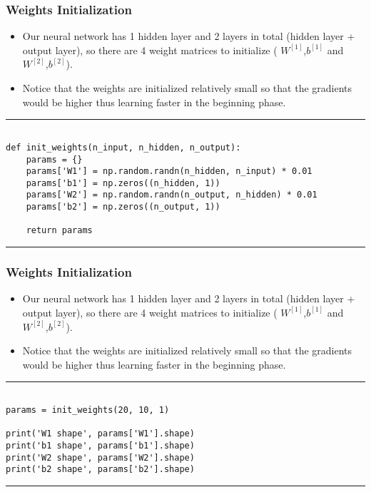\documentclass[11pt]{beamer}
\begin{document}
%
%
\begin{frame}[fragile]
\frametitle{Weights Initialization}
\begin{itemize}
\item Our neural network has 1 hidden layer and 2 layers in total (hidden layer + output layer), so there are 4 weight matrices to initialize ( $W^{[1]}$,$b^{[1]}$  and  $W^{[2]}$,$b^{[2]}$). 
\item Notice that the weights are initialized relatively small so that the gradients would be higher thus learning faster in the beginning phase.
\end{itemize}
\rule{\textwidth}{1pt}
\scriptsize
\begin{verbatim}

def init_weights(n_input, n_hidden, n_output):
    params = {}
    params['W1'] = np.random.randn(n_hidden, n_input) * 0.01
    params['b1'] = np.zeros((n_hidden, 1))
    params['W2'] = np.random.randn(n_output, n_hidden) * 0.01
    params['b2'] = np.zeros((n_output, 1))
    
    return params
\end{verbatim}
\rule{\textwidth}{1pt}
\end{frame}
\begin{frame}[fragile]
\frametitle{Weights Initialization}
\begin{itemize}
\item Our neural network has 1 hidden layer and 2 layers in total (hidden layer + output layer), so there are 4 weight matrices to initialize ( $W^{[1]}$,$b^{[1]}$  and  $W^{[2]}$,$b^{[2]}$). 
\item Notice that the weights are initialized relatively small so that the gradients would be higher thus learning faster in the beginning phase.
\end{itemize}
\rule{\textwidth}{1pt}
\scriptsize
\begin{verbatim}

params = init_weights(20, 10, 1)

print('W1 shape', params['W1'].shape)
print('b1 shape', params['b1'].shape)
print('W2 shape', params['W2'].shape)
print('b2 shape', params['b2'].shape)

\end{verbatim}
\rule{\textwidth}{1pt}
\end{frame}
\end{document}
